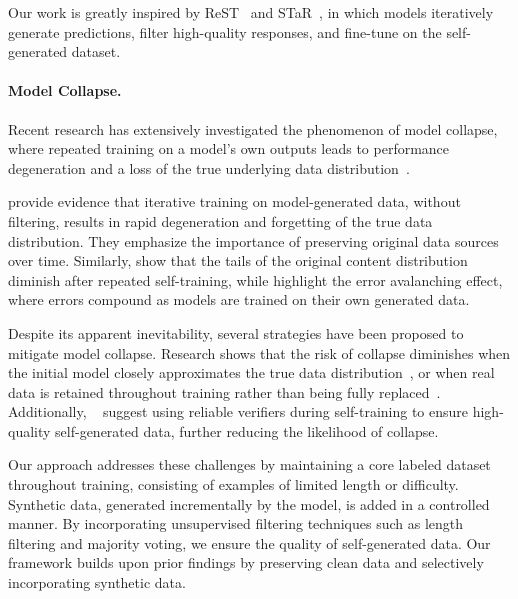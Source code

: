 Our work is greatly inspired by ReST~\citep{gulcehre2023reinforced} and STaR~\citep{zelikman2022star}, in which models iteratively generate predictions, filter high-quality responses, and fine-tune on the self-generated dataset.











\paragraph{Model Collapse.}
Recent research has extensively investigated the phenomenon of model collapse, where repeated training on a model's own outputs leads to performance degeneration and a loss of the true underlying data distribution~\citep{shumailov2024ai,Hataya_2023_ICCV,Arcaute2023CombiningGA,shumailov2023curse,Alemohammad2023SelfConsumingGM,Briesch2023LargeLM}.

\citet{shumailov2024ai} provide evidence that iterative training on model-generated data, without filtering, results in rapid degeneration and forgetting of the true data distribution. They emphasize the importance of preserving original data sources over time. Similarly, \citet{shumailov2023curse} show that the tails of the original content distribution diminish after repeated self-training, while \citet{zhang2023chain} highlight the error avalanching effect, where errors compound as models are trained on their own generated data.

Despite its apparent inevitability, several strategies have been proposed to mitigate model collapse. Research shows that the risk of collapse diminishes when the initial model closely approximates the true data distribution~\citep{Bertrand2023OnTS}, or when real data is retained throughout training rather than being fully replaced~\citep{gerstgrasser2024model,Dohmatob2024ATO,Briesch2023LargeLM}. Additionally, ~\citet{gillman2024self,feng2024beyond} suggest using reliable verifiers during self-training to ensure high-quality self-generated data, further reducing the likelihood of collapse.

Our approach addresses these challenges by maintaining a core labeled dataset throughout training, consisting of examples of limited length or difficulty. Synthetic data, generated incrementally by the model, is added in a controlled manner. By incorporating unsupervised filtering techniques such as length filtering and majority voting, we ensure the quality of self-generated data. Our framework builds upon prior findings by preserving clean data and selectively incorporating synthetic data.

